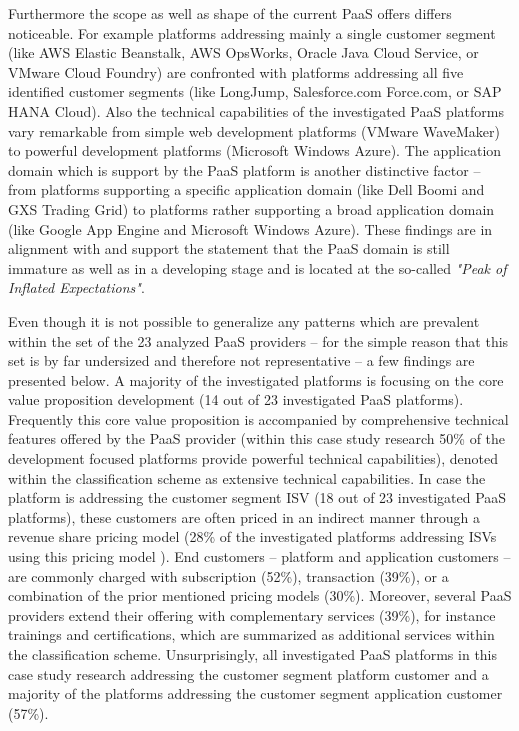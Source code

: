 Furthermore the scope as well as shape of the current \ac{PaaS} offers differs noticeable. For example platforms addressing mainly a single customer segment (like \ac{AWS} Elastic Beanstalk, \ac{AWS} OpsWorks, Oracle Java Cloud Service, or VMware Cloud Foundry) are confronted with platforms addressing all five identified customer segments (like LongJump, Salesforce.com Force.com, or SAP HANA Cloud). Also the technical capabilities of the investigated \ac{PaaS} platforms vary remarkable from simple web development platforms (VMware WaveMaker) to powerful development platforms (Microsoft Windows Azure). The application domain which is support by the \ac{PaaS} platform is another distinctive factor -- from platforms supporting a specific application domain (like Dell Boomi and GXS Trading Grid) to platforms rather supporting a broad application domain (like Google App Engine and Microsoft Windows Azure). These findings are in alignment with \citep[p. 5]{Smith2012} and support the statement that the \ac{PaaS} domain is still immature as well as in a developing stage and is located at the so-called \textit{"Peak of Inflated Expectations"}.

Even though it is not possible to generalize any patterns which are prevalent within the set of the 23 analyzed \ac{PaaS} providers -- for the simple reason that this set is by far undersized and therefore not representative -- a few findings are presented below. A majority of the investigated platforms is focusing on the core value proposition development (14 out of 23 investigated \ac{PaaS} platforms). Frequently this core value proposition is accompanied by comprehensive technical features offered by the \ac{PaaS} provider (within this case study research 50\% of the development focused platforms provide powerful technical capabilities), denoted within the classification scheme as extensive technical capabilities. In case the platform is addressing the customer segment \ac{ISV} (18 out of 23 investigated \ac{PaaS} platforms), these customers are often priced in an indirect manner through a revenue share pricing model (28\% of the investigated platforms addressing \acp{ISV} using this pricing model ). End customers -- platform and application customers -- are commonly charged with subscription (52\%), transaction (39\%), or a combination of the prior mentioned pricing models (30\%). Moreover, several \ac{PaaS} providers extend their offering with complementary services (39\%), for instance trainings and certifications, which are summarized as additional services within the classification scheme. Unsurprisingly, all investigated \ac{PaaS} platforms in this case study research addressing the customer segment platform customer and a majority of the platforms addressing the customer segment application customer (57\%).

